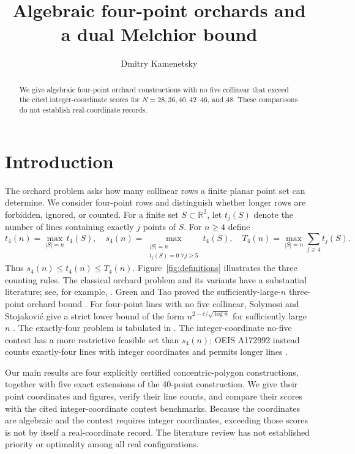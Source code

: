 \documentclass[11pt,a4paper]{amsart}
\title[Algebraic four-point orchards]{Algebraic four-point orchards and a dual Melchior bound}
\author{Dmitry Kamenetsky}
\theoremstyle{remark}\newtheorem{remark}[theorem]{Remark}
\newcommand{\R}{\mathbb R}
\begin{document}
\begin{abstract}
We give algebraic four-point orchard constructions with no five collinear that exceed the cited integer-coordinate scores for $N=28,36,40,42$--$46$, and $48$. These comparisons do not establish real-coordinate records.
\end{abstract}
\maketitle
\section{Introduction}
The orchard problem asks how many collinear rows a finite planar point set can determine. We consider four-point rows and distinguish whether longer rows are forbidden, ignored, or counted. For a finite set $S\subset\R^2$, let $t_j(S)$ denote the number of lines containing exactly $j$ points of $S$. For $n\ge4$ define
\[
 t_4(n)=\max_{|S|=n}t_4(S),\quad
 s_4(n)=\max_{\substack{|S|=n\\t_j(S)=0\;\forall j\ge5}}t_4(S),\quad
 T_4(n)=\max_{|S|=n}\sum_{j\ge4}t_j(S).
\]
Thus $s_4(n)\le t_4(n)\le T_4(n)$. Figure~\ref{fig:definitions} illustrates the three counting rules. The classical orchard problem and its variants have a substantial literature; see, for example, \cite{BGS,Elkies,Solymosi}. Green and Tao proved the sufficiently-large-$n$ three-point orchard bound \cite{GreenTao}. For four-point lines with no five collinear, Solymosi and Stojakovi\'c give a strict lower bound of the form $n^{2-c/\sqrt{\log n}}$ for sufficiently large $n$ \cite{Solymosi}. The exactly-four problem is tabulated in \cite{OEISreal,Du,MathWorld}. The integer-coordinate no-five contest \cite{Contest} has a more restrictive feasible set than $s_4(n)$; OEIS A172992 instead counts exactly-four lines with integer coordinates and permits longer lines \cite{OEISint}.

Our main results are four explicitly certified concentric-polygon constructions, together with five exact extensions of the 40-point construction. We give their point coordinates and figures, verify their line counts, and compare their scores with the cited integer-coordinate contest benchmarks. Because the coordinates are algebraic and the contest requires integer coordinates, exceeding those scores is not by itself a real-coordinate record. The literature review has not established priority or optimality among all real configurations.
\end{document}
